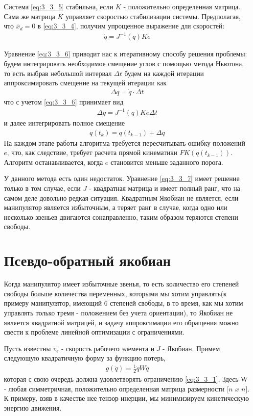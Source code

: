 Система \ref{eq:3_3_5} стабильна, если $K$ - положительно определенная матрица. Сама же матрица $K$ управляет скоростью стабилизации системы. Предполагая, что $\dot{x_{d}} = 0$ в \ref{eq:3_3_4}, получим упрощенное выражение для скоростей:
\begin{align} \label{eq:3_3_6}
	\dot{q} = J^{-1}(q)Ke
\end{align}

Уравнение \ref{eq:3_3_6} приводит нас к итеративному способу решения проблемы: будем интегрировать необходимое смещение углов с помощью метода Ньютона, то есть выбрав небольшой интервал $\Delta t$ будем на каждой итерации аппроксимировать смещение на текущей итерации как 
\begin{align*}
	\Delta q = \dot{q} \cdot \Delta t 
\end{align*}
что с учетом \ref{eq:3_3_6} принимает вид
\begin{align} \label{eq:3_3_7}
	\Delta q = J^{-1}(q)Ke\Delta t
\end{align}
и далее интегрировать полное смещение
\begin{align*}
	q(t_{k}) = q(t_{k-1}) + \Delta q
\end{align*}
На каждом этапе работы алгоритма требуется пересчитывать ошибку положений $e$, что, как следствие, требует расчета прямой кинематики $FK(q(t_{k-1}))$. Алгоритм останавливается, когда $e$ становится меньше заданного порога. 

У данного метода есть один недостаток. Уравнение \ref{eq:3_3_7} имеет решение только в том случае, если $J$ - квадратная матрица и имеет полный ранг, что на самом деле довольно редкая ситуация. Квадратным Якобиан не является, если манипулятор является избыточным, а теряет ранг в случае, когда одно или несколько звеньев двигаются сонаправленно, таким образом теряются степени свободы.


\section{Псевдо-обратный якобиан} \label{sec:3_4}
Когда манипулятор имеет избыточные звенья, то есть количество его степеней свободы больше количества переменных, которыми мы хотим управлять(к примеру манипулятор, имеющий 6 степеней свободы, в то время, как мы хотим управлять только тремя - положением без учета ориентации), то Якобиан не является квадратной матрицей, и задачу аппроксимации его обращения можно свести к проблеме линейной оптимизации с ограничениями. \cite{Bruno}

Пусть известны $v_{e}$ - скорость рабочего элемента и $J$ - Якобиан. Примем следующую квадратичную форму за функцию потерь, 
\begin{align}
	g(\dot q) = \frac{1}{2} \dot q W \dot{q}
\end{align}
которая с свою очередь должна удовлетворять ограничению \ref{eq:3_3_1}. Здесь W - любая симметричная, положительно определенная матрица размерности $[n$ $x$ $n]$. К примеру, взяв в качестве нее тензор инерции, мы минимизируем кинетическую энергию движения.

